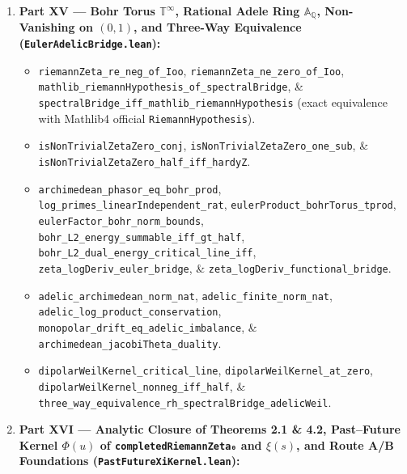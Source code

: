 \documentclass[
  11pt,
]{article}
\providecommand{\tightlist}{%
  \setlength{\itemsep}{0pt}\setlength{\parskip}{0pt}}
\begin{document}
\begin{enumerate}
  \begin{itemize}
  \tightlist
  \item
    \texttt{casimir\_crit\_sub\_casimir\_eq\_deficit},
    \texttt{casimir\_deficit\_eq\_zero\_iff\_half},
    \texttt{sectional\_curvature\_eq\_zero\_iff\_half},
    \texttt{symplectic\_div\_eq\_zero\_iff\_half},
    \texttt{lyapunov\_eq\_zero\_iff\_half},
    \texttt{lyapunov\_pos\_of\_ne\_half},
    \texttt{functional\_reflection\_fixed\_point\_iff},
    \texttt{scale\_defect\_eq\_zero\_iff},
    \texttt{duality\_forces\_half},
    \texttt{radial\_drift\_sinh\_eq\_zero\_iff\_half},
    \texttt{minkowski\_pseudonorm\_eq\_one},
    \texttt{euclidean\_phase\_energy\_eq\_one\_iff\_half},
    \texttt{master\_equilibrium\_iff}, and
    \texttt{master\_geometric\_equivalence\_real}.
  \end{itemize}
\item
  \textbf{Part XV --- Bohr Torus \(\mathbb{T}^\infty\), Rational Adele
  Ring \(\mathbb{A}_\mathbb{Q}\), Non-Vanishing on \((0, 1)\), and
  Three-Way Equivalence (\texttt{EulerAdelicBridge.lean}):}

  \begin{itemize}
  \tightlist
  \item
    \texttt{riemannZeta\_re\_neg\_of\_Ioo},
    \texttt{riemannZeta\_ne\_zero\_of\_Ioo},
    \texttt{mathlib\_riemannHypothesis\_of\_spectralBridge}, \&
    \texttt{spectralBridge\_iff\_mathlib\_riemannHypothesis} (exact
    equivalence with Mathlib4 official \texttt{RiemannHypothesis}).
  \item
    \texttt{isNonTrivialZetaZero\_conj},
    \texttt{isNonTrivialZetaZero\_one\_sub}, \&
    \texttt{isNonTrivialZetaZero\_half\_iff\_hardyZ}.
  \item
    \texttt{archimedean\_phasor\_eq\_bohr\_prod},
    \texttt{log\_primes\_linearIndependent\_rat},
    \texttt{eulerProduct\_bohrTorus\_tprod},
    \texttt{eulerFactor\_bohr\_norm\_bounds},
    \texttt{bohr\_L2\_energy\_summable\_iff\_gt\_half},
    \texttt{bohr\_L2\_dual\_energy\_critical\_line\_iff},
    \texttt{zeta\_logDeriv\_euler\_bridge}, \&
    \texttt{zeta\_logDeriv\_functional\_bridge}.
  \item
    \texttt{adelic\_archimedean\_norm\_nat},
    \texttt{adelic\_finite\_norm\_nat},
    \texttt{adelic\_log\_product\_conservation},
    \texttt{monopolar\_drift\_eq\_adelic\_imbalance}, \&
    \texttt{archimedean\_jacobiTheta\_duality}.
  \item
    \texttt{dipolarWeilKernel\_critical\_line},
    \texttt{dipolarWeilKernel\_at\_zero},
    \texttt{dipolarWeilKernel\_nonneg\_iff\_half}, \&
    \texttt{three\_way\_equivalence\_rh\_spectralBridge\_adelicWeil}.
  \end{itemize}
\item
  \textbf{Part XVI --- Analytic Closure of Theorems 2.1 \& 4.2,
  Past--Future Kernel \(\Phi(u)\) of \texttt{completedRiemannZeta₀} and
  \(\xi(s)\), and Route A/B Foundations
  (\texttt{PastFutureXiKernel.lean}):}


\end{enumerate}
\end{document}
